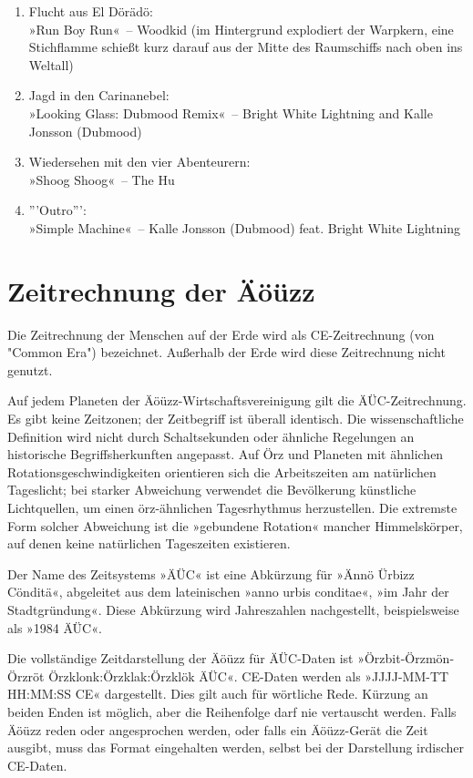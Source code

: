 \begin{enumerate}
    \item Flucht aus El Dörädö:\\ »Run Boy Run«~– Woodkid                                      (im Hintergrund explodiert der Warpkern, eine Stichflamme schießt kurz darauf aus der Mitte des Raumschiffs nach oben ins Weltall)
    \item Jagd in den Carinanebel:\\ »Looking Glass: Dubmood Remix«~– Bright White Lightning and Kalle Jonsson (Dubmood)
    \item Wiedersehen mit den vier Abenteurern:\\ »Shoog Shoog«~– The Hu
    \item '''Outro''':\\ »Simple Machine«~– Kalle Jonsson (Dubmood) feat. Bright White Lightning
\end{enumerate}

\chapter{Zeitrechnung der Äöüzz}

Die Zeitrechnung der Menschen auf der Erde wird als CE-Zeitrechnung (von "Common Era") bezeichnet. Außerhalb der Erde wird diese Zeitrechnung nicht genutzt.

Auf jedem Planeten der Äöüzz-Wirtschaftsvereinigung gilt die ÄÜC-Zeitrechnung. Es gibt keine Zeitzonen; der Zeitbegriff ist überall identisch. Die wissenschaftliche Definition wird nicht durch Schaltsekunden oder ähnliche Regelungen an historische Begriffsherkunften angepasst. Auf Örz und Planeten mit ähnlichen Rotationsgeschwindigkeiten orientieren sich die Arbeitszeiten am natürlichen Tageslicht; bei starker Abweichung verwendet die Bevölkerung künstliche Lichtquellen, um einen örz-ähnlichen Tagesrhythmus herzustellen. Die extremste Form solcher Abweichung ist die »gebundene Rotation« mancher Himmelskörper, auf denen keine natürlichen Tageszeiten existieren.

Der Name des Zeitsystems »ÄÜC« ist eine Abkürzung für »Ännö Ürbizz Cönditä«, abgeleitet aus dem lateinischen »anno urbis conditae«, »im Jahr der Stadtgründung«. Diese Abkürzung wird Jahreszahlen nachgestellt, beispielsweise als »1984 ÄÜC«.

Die vollständige Zeitdarstellung der Äöüzz für ÄÜC-Daten ist »Örzbit-Örzmön-Örzröt Örzklonk:Örzklak:Örzklök ÄÜC«. CE-Daten werden als »JJJJ-MM-TT HH:MM:SS CE« dargestellt. Dies gilt auch für wörtliche Rede. Kürzung an beiden Enden ist möglich, aber die Reihenfolge darf nie vertauscht werden. Falls Äöüzz reden oder angesprochen werden, oder falls ein Äöüzz-Gerät die Zeit ausgibt, muss das Format eingehalten werden, selbst bei der Darstellung irdischer CE-Daten.

